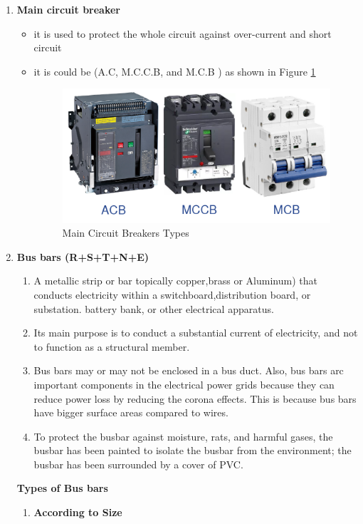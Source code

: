 \documentclass[12pt,fleqn]{book} %
\begin{document}
\begin{enumerate}
\item \textbf {Main circuit breaker}
\begin{itemize}
    \item it is used to protect the whole circuit against over-current and short circuit 
    \item it is could be (A.C, M.C.C.B, and M.C.B ) as shown in Figure \ref{fig:fergany 2}
    \begin{figure}[h!]
    \centering
    \includegraphics[width=0.9\linewidth]{fergany 2.png}
    \caption{Main Circuit Breakers Types}
    \label{fig:fergany 2}
\end{figure}
\end{itemize}
\item \textbf {Bus bars (R+S+T+N+E)}
\begin{enumerate}
\item A metallic strip or bar topically copper,brass or Aluminum) that conducts electricity within a switchboard,distribution board, or substation. battery bank, or other electrical apparatus.
\item Its main purpose is to conduct a substantial current of electricity, and not to function as a structural member.
\item Bus bars may or may not be enclosed in a bus duct. Also, bus bars arc important components in the electrical power grids because they can reduce power loss by reducing the corona effects. This is because bus bars have bigger surface areas compared to wires.
\item To protect the busbar against moisture, rats, and harmful gases, the busbar has been painted to isolate the busbar from the environment; the busbar has been surrounded by a cover of PVC.
\end{enumerate}
\textbf {Types of Bus bars}
    \begin{enumerate}
       \item \textbf {According to Size}

\end{enumerate}
\end{enumerate}
\end{document}

